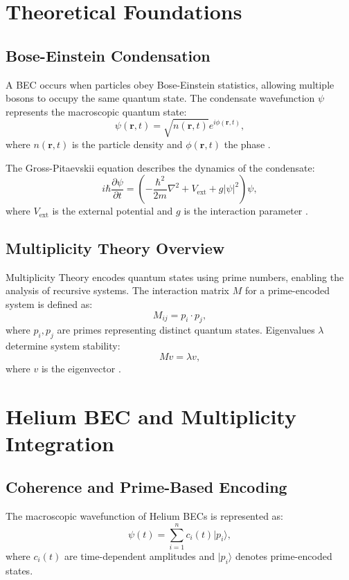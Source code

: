 \documentclass{article}
\theoremstyle{plain}
\begin{document}
\section{Theoretical Foundations}
\subsection{Bose-Einstein Condensation}
A BEC occurs when particles obey Bose-Einstein statistics, allowing multiple bosons to occupy the same quantum state. The condensate wavefunction $\psi$ represents the macroscopic quantum state:
\begin{equation}
\psi(\mathbf{r},t) = \sqrt{n(\mathbf{r},t)} e^{i \phi(\mathbf{r},t)},
\end{equation}
where $n(\mathbf{r},t)$ is the particle density and $\phi(\mathbf{r},t)$ the phase \cite{pethick2008}.

The Gross-Pitaevskii equation describes the dynamics of the condensate:
\begin{equation}
i \hbar \frac{\partial \psi}{\partial t} = \left( -\frac{\hbar^2}{2m} \nabla^2 + V_{\text{ext}} + g |\psi|^2 \right) \psi,
\end{equation}
where $V_{\text{ext}}$ is the external potential and $g$ is the interaction parameter \cite{nozieres1990}.

\subsection{Multiplicity Theory Overview}
Multiplicity Theory encodes quantum states using prime numbers, enabling the analysis of recursive systems. The interaction matrix $M$ for a prime-encoded system is defined as:
\begin{equation}
M_{ij} = p_i \cdot p_j,
\end{equation}
where $p_i, p_j$ are primes representing distinct quantum states. Eigenvalues $\lambda$ determine system stability:
\begin{equation}
M v = \lambda v,
\end{equation}
where $v$ is the eigenvector \cite{multiplicity2024}.

\section{Helium BEC and Multiplicity Integration}
\subsection{Coherence and Prime-Based Encoding}
The macroscopic wavefunction of Helium BECs is represented as:
\begin{equation}
\psi(t) = \sum_{i=1}^n c_i(t) |p_i\rangle,
\end{equation}
where $c_i(t)$ are time-dependent amplitudes and $|p_i\rangle$ denotes prime-encoded states.
\end{document}
